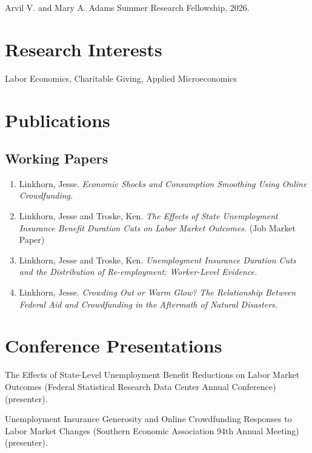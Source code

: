 \documentclass[letterpaper]{article}
\renewenvironment{itemize}{
  \begin{list}{}{
    \setlength{\leftmargin}{1.5em}
  }
}{
  \end{list}
}
\begin{document}
\begin{itemize}
\item Arvil V. and Mary A. Adams Summer Research Fellowship, 2026.
\end{itemize}


\section*{Research Interests}

Labor Economics, Charitable Giving, Applied Microeconomics

\section*{Publications}

\subsection*{Working Papers}

\begin{enumerate}[resume]
\item Linkhorn, Jesse. \textit{Economic Shocks and Consumption Smoothing Using Online Crowdfunding.}
\item Linkhorn, Jesse and Troske, Ken. \textit{The Effects of State Unemployment Insurance Benefit Duration Cuts on Labor Market Outcomes.} (Job Market Paper)
\item Linkhorn, Jesse and Troske, Ken. \textit{Unemployment Insurance Duration Cuts and the Distribution of Re-employment: Worker-Level Evidence.}
\item Linkhorn, Jesse. \textit{Crowding Out or Warm Glow? The Relationship Between Federal Aid and Crowdfunding in the Aftermath of Natural Disasters.}
\end{enumerate}

\section*{Conference Presentations}

\begin{description}[font=\mdseries]
\item[2026]
  The Effects of State-Level Unemployment Benefit Reductions on Labor Market Outcomes (Federal Statistical Research Data Center Annual Conference) (presenter).

\item[2024]
  Unemployment Insurance Generosity and Online Crowdfunding Responses to Labor Market Changes (Southern Economic Association 94th Annual Meeting) (presenter).

\end{description}
\end{document}
